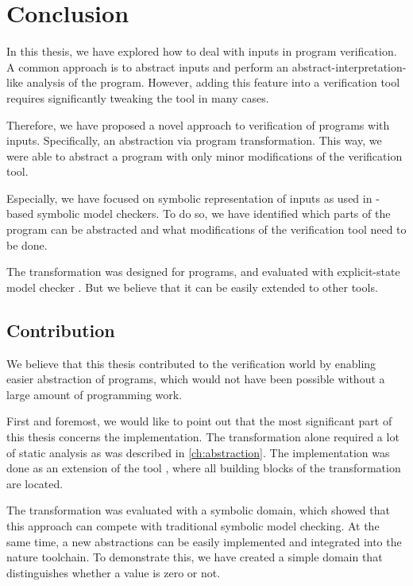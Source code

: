 \chapter{Conclusion}\label{ch:conclusion}

In this thesis, we have explored how to deal with inputs in program
verification. A common approach is to abstract inputs and perform an
abstract-interpretation-like analysis of the program. However, adding this feature into a
verification tool requires significantly tweaking the tool in many cases.

Therefore, we have proposed a novel approach to verification of programs with
inputs. Specifically, an abstraction via program transformation. This way, we
were able to abstract a program with only minor modifications of the verification
tool.

Especially, we have focused on symbolic representation of inputs as used in \SMT-based
symbolic model checkers. To do so, we have identified which parts of the program can be
abstracted and what modifications of the verification tool need to be done.

The transformation was designed for \LLVM{} programs, and evaluated with
explicit-state model checker \DIVINE. But we believe that it can be easily extended
to other tools.

\section{Contribution}
We believe that this thesis contributed to the verification world by enabling
easier abstraction of programs, which would not have been possible without a
large amount of programming work.


First and foremost, we would like to point out that the most significant part of
this thesis concerns the implementation. The transformation alone required
a lot of static analysis as was described in \autoref{ch:abstraction}. The
implementation was done as an extension of the tool \LART, where all building
blocks of the transformation are located.

The transformation was evaluated with a symbolic domain,
which showed that this approach can compete with traditional symbolic model
checking. At the same time, a new abstractions can be easily implemented and
integrated into the nature \DIVINE toolchain. To demonstrate this, we have created a
simple domain that distinguishes whether a value is zero or not.

